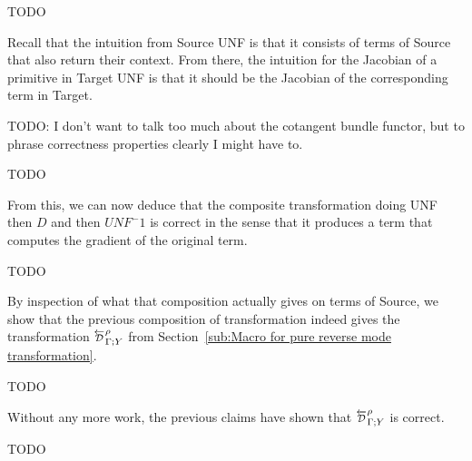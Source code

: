 \begin{proposition}[Correctness $D$]
    TODO
\end{proposition}

Recall that the intuition from Source UNF is that it consists of terms of Source that also return their context.
From there, the intuition for the Jacobian of a primitive in Target UNF is that it should be the Jacobian of
the corresponding term in Target. 

TODO: I don't want to talk too much about the cotangent bundle functor, but to phrase correctness properties clearly I might have to.

\begin{proposition}
    TODO
\end{proposition}

From this, we can now deduce that the composite transformation doing UNF then $D$ and then $UNF^-1$ is correct
in the sense that it produces a term that computes the gradient of the original term.

\begin{theorem}
    TODO
\end{theorem}

By inspection of what that composition actually gives on terms of Source, 
we show that the previous composition of transformation indeed gives the transformation 
$\directD{\rho}{\Gamma}{Y}$ from Section~\ref{sub:Macro for pure reverse mode transformation}. 

\begin{proposition}[UNF;D;$UNF^-1$=D]
    TODO
\end{proposition}

Without any more work, the previous claims have shown that 
$\directD{\rho}{\Gamma}{Y}$ is correct.

\begin{theorem}[D is correct]
    TODO
\end{theorem}
